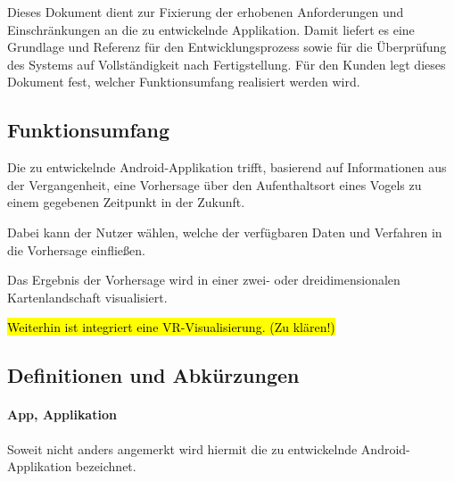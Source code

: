 \documentclass[12pt]{article} %
\begin{document}
 Dieses Dokument dient  zur Fixierung der erhobenen Anforderungen und Einschränkungen an die zu entwickelnde Applikation. Damit liefert es eine Grundlage und Referenz für den Entwicklungsprozess sowie für die Überprüfung des Systems auf Vollständigkeit nach Fertigstellung. Für den Kunden legt dieses Dokument fest, welcher Funktionsumfang realisiert werden wird.


\subsection{Funktionsumfang}

Die zu entwickelnde Android-Applikation trifft, basierend auf Informationen aus der Vergangenheit, eine Vorhersage über den Aufenthaltsort eines Vogels zu einem gegebenen Zeitpunkt in der Zukunft. 

Dabei kann der Nutzer wählen, welche der verfügbaren Daten und Verfahren in die Vorhersage einfließen. 

Das Ergebnis der Vorhersage wird in einer zwei- oder dreidimensionalen Kartenlandschaft visualisiert.

\hl{Weiterhin ist integriert eine VR-Visualisierung. (Zu klären!)}


\subsection{Definitionen und Abkürzungen}



 

\paragraph{App, Applikation} Soweit nicht anders angemerkt wird hiermit die zu entwickelnde Android-Applikation bezeichnet.
\end{document}
